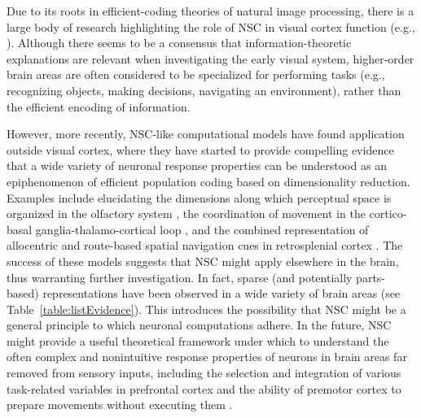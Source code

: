 Due to its roots in efficient-coding theories of natural image processing,
there is a large body of research highlighting the role of \ac{NSC} in
visual cortex function
(e.g., \cite{Barlow1961,OlshausenField1996,Hoyer2003,BenHamed2003}).
Although there seems to be a consensus that 
information-theoretic explanations are relevant 
when investigating the early visual system,
higher-order brain areas are often considered to be specialized for
performing tasks
(e.g., recognizing objects, making decisions, navigating an environment),
rather than the efficient encoding of information.

However, more recently, 
\ac{NSC}-like computational models have found application outside visual cortex,
where they have started to provide compelling evidence that a wide variety of
neuronal response properties can be understood as an epiphenomenon
of efficient population coding based on dimensionality reduction.
Examples include elucidating the dimensions along which perceptual space
is organized in the olfactory system
\cite{MorenoBoteDrugowitsch2015,Castro2013},
the coordination of movement in the cortico-basal ganglia-thalamo-cortical loop
\cite{BarGad2000,BarGad2003_Review},
and the combined representation of allocentric and route-based 
spatial navigation cues
in retrosplenial cortex \cite{Rounds2018}.
The success of these models suggests that \ac{NSC}
might apply elsewhere in the brain, 
thus warranting further investigation.
In fact, sparse (and potentially parts-based) representations have been observed
in a wide variety of brain areas
(see Table~\ref{table:listEvidence}).
This introduces the  possibility that \ac{NSC} might
be a general principle to which  neuronal computations adhere.
In the future, \ac{NSC} might provide a useful theoretical framework
under which to understand the often complex and nonintuitive response properties
of neurons in brain areas far removed from sensory inputs,
including the selection and integration of various task-related variables
in prefrontal cortex
\cite{Mante2013}
and the ability of premotor cortex to prepare movements without executing them
\cite{Kaufman2014}.



